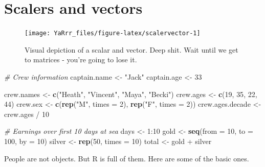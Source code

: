 \documentclass[]{book}
\newenvironment{Shaded}{\begin{snugshade}}{\end{snugshade}}
\newcommand{\KeywordTok}[1]{\textcolor[rgb]{0.13,0.29,0.53}{\textbf{{#1}}}}
\newcommand{\DataTypeTok}[1]{\textcolor[rgb]{0.13,0.29,0.53}{{#1}}}
\newcommand{\DecValTok}[1]{\textcolor[rgb]{0.00,0.00,0.81}{{#1}}}
\newcommand{\StringTok}[1]{\textcolor[rgb]{0.31,0.60,0.02}{{#1}}}
\newcommand{\CommentTok}[1]{\textcolor[rgb]{0.56,0.35,0.01}{\textit{{#1}}}}
\newcommand{\NormalTok}[1]{{#1}}
\theoremstyle{definition}
\theoremstyle{definition}
\theoremstyle{remark}
\begin{document}
\chapter{Scalers and vectors}\label{scalersvectors}

\begin{figure}

{\centering \texttt{[image: YaRrr\_files/figure-latex/scalervector-1]} 

}

\caption{Visual depiction of a scalar and vector. Deep shit. Wait until we get to matrices - you're going to lose it.}\label{fig:scalervector}
\end{figure}

\begin{Shaded}
\begin{Highlighting}[]
\CommentTok{# Crew information}
\NormalTok{captain.name <-}\StringTok{ "Jack"}
\NormalTok{captain.age <-}\StringTok{ }\DecValTok{33}

\NormalTok{crew.names <-}\StringTok{ }\KeywordTok{c}\NormalTok{(}\StringTok{"Heath"}\NormalTok{, }\StringTok{"Vincent"}\NormalTok{, }\StringTok{"Maya"}\NormalTok{, }\StringTok{"Becki"}\NormalTok{)}
\NormalTok{crew.ages <-}\StringTok{ }\KeywordTok{c}\NormalTok{(}\DecValTok{19}\NormalTok{, }\DecValTok{35}\NormalTok{, }\DecValTok{22}\NormalTok{, }\DecValTok{44}\NormalTok{)}
\NormalTok{crew.sex <-}\StringTok{ }\KeywordTok{c}\NormalTok{(}\KeywordTok{rep}\NormalTok{(}\StringTok{"M"}\NormalTok{, }\DataTypeTok{times =} \DecValTok{2}\NormalTok{), }\KeywordTok{rep}\NormalTok{(}\StringTok{"F"}\NormalTok{, }\DataTypeTok{times =} \DecValTok{2}\NormalTok{))}
\NormalTok{crew.ages.decade <-}\StringTok{ }\NormalTok{crew.ages /}\StringTok{ }\DecValTok{10}

\CommentTok{# Earnings over first 10 days at sea}
\NormalTok{days <-}\StringTok{ }\DecValTok{1}\NormalTok{:}\DecValTok{10}
\NormalTok{gold <-}\StringTok{ }\KeywordTok{seq}\NormalTok{(}\DataTypeTok{from =} \DecValTok{10}\NormalTok{, }\DataTypeTok{to =} \DecValTok{100}\NormalTok{, }\DataTypeTok{by =} \DecValTok{10}\NormalTok{)}
\NormalTok{silver <-}\StringTok{ }\KeywordTok{rep}\NormalTok{(}\DecValTok{50}\NormalTok{, }\DataTypeTok{times =} \DecValTok{10}\NormalTok{)}
\NormalTok{total <-}\StringTok{ }\NormalTok{gold +}\StringTok{ }\NormalTok{silver}
\end{Highlighting}
\end{Shaded}

People are not objects. But R is full of them. Here are some of the
basic ones.
\end{document}
